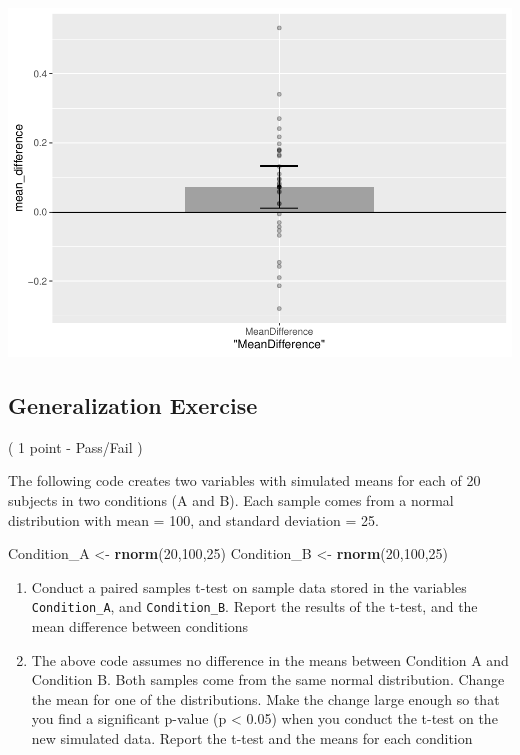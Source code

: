 \documentclass[]{book}
\newenvironment{Shaded}{\begin{snugshade}}{\end{snugshade}}
\newcommand{\KeywordTok}[1]{\textcolor[rgb]{0.13,0.29,0.53}{\textbf{#1}}}
\newcommand{\DecValTok}[1]{\textcolor[rgb]{0.00,0.00,0.81}{#1}}
\newcommand{\StringTok}[1]{\textcolor[rgb]{0.31,0.60,0.02}{#1}}
\newcommand{\NormalTok}[1]{#1}
\begin{document}
\includegraphics{Statistics_Lab_files/figure-latex/unnamed-chunk-181-1.pdf}

\subsection{Generalization Exercise}\label{generalization-exercise-5}

( 1 point - Pass/Fail )

The following code creates two variables with simulated means for each
of 20 subjects in two conditions (A and B). Each sample comes from a
normal distribution with mean = 100, and standard deviation = 25.

\begin{Shaded}
\begin{Highlighting}[]
\NormalTok{Condition_A <-}\StringTok{ }\KeywordTok{rnorm}\NormalTok{(}\DecValTok{20}\NormalTok{,}\DecValTok{100}\NormalTok{,}\DecValTok{25}\NormalTok{)}
\NormalTok{Condition_B <-}\StringTok{ }\KeywordTok{rnorm}\NormalTok{(}\DecValTok{20}\NormalTok{,}\DecValTok{100}\NormalTok{,}\DecValTok{25}\NormalTok{)}
\end{Highlighting}
\end{Shaded}

\begin{enumerate}
\def\labelenumi{\arabic{enumi}.}
\item
  Conduct a paired samples t-test on sample data stored in the variables
  \texttt{Condition\_A}, and \texttt{Condition\_B}. Report the results
  of the t-test, and the mean difference between conditions
\item
  The above code assumes no difference in the means between Condition A
  and Condition B. Both samples come from the same normal distribution.
  Change the mean for one of the distributions. Make the change large
  enough so that you find a significant p-value (p \textless{} 0.05)
  when you conduct the t-test on the new simulated data. Report the
  t-test and the means for each condition
\end{enumerate}
\end{document}
